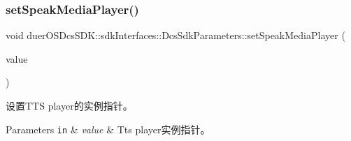 \subsubsection{\texorpdfstring{set\+Speak\+Media\+Player()}{setSpeakMediaPlayer()}}
{\footnotesize\ttfamily void duer\+O\+S\+Dcs\+S\+D\+K\+::sdk\+Interfaces\+::\+Dcs\+Sdk\+Parameters\+::set\+Speak\+Media\+Player (\begin{DoxyParamCaption}\item[{std\+::shared\+\_\+ptr$<$ \hyperlink{classduerOSDcsSDK_1_1sdkInterfaces_1_1MediaPlayerInterface}{Media\+Player\+Interface} $>$}]{value }\end{DoxyParamCaption})\hspace{0.3cm}{\ttfamily [inline]}}



设置\+T\+TS player的实例指针。 


\begin{DoxyParams}[1]{Parameters}
\mbox{\tt in}  & {\em value} & Tts player实例指针。 \\
\hline
\end{DoxyParams}
